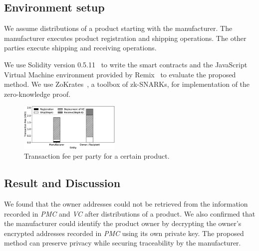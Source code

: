 \documentclass[conference]{IEEEtran}
\begin{document}
\subsection{Environment setup}
We assume %
distributions of a %
product %
starting with the manufacturer.
The manufacturer executes product registration and shipping operations.
The other %
parties execute shipping and receiving operations.

We use Solidity version 0.5.11~\cite{Solidity} to write the smart contracts and the JavaScript Virtual Machine environment provided by Remix~\cite{Remix} to evaluate the %
proposed method.
We use ZoKrates~\cite{ZoKrates}, a toolbox of zk-SNARKs, for implementation of the zero-knowledge proof.

\begin{figure}[t]
    \centering
    \includegraphics[width=0.43\textwidth]{graph.eps}
    \caption{Transaction fee per party for a certain product.\label{fig:evaluation}}
\end{figure}


\subsection{Result and Discussion}
We found that the owner addresses could not be retrieved from the information recorded in %
\textit{PMC} and \textit{VC} after %
distributions of a %
product.
We also confirmed that the manufacturer could identify the product owner by decrypting the owner's encrypted addresses recorded in \textit{PMC} using its own private key.
The proposed method can preserve privacy while 
securing traceability by the manufacturer.
\end{document}
